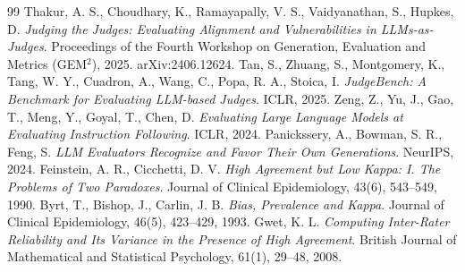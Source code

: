 \documentclass{IOS-Book-Article}
\begin{document}
\begin{thebibliography}{99}
 Thakur, A. S., Choudhary, K., Ramayapally, V. S., Vaidyanathan, S., Hupkes, D. \emph{Judging the Judges: Evaluating Alignment and Vulnerabilities in LLMs-as-Judges}. Proceedings of the Fourth Workshop on Generation, Evaluation and Metrics (GEM$^{2}$), 2025. arXiv:2406.12624.
 Tan, S., Zhuang, S., Montgomery, K., Tang, W. Y., Cuadron, A., Wang, C., Popa, R. A., Stoica, I. \emph{JudgeBench: A Benchmark for Evaluating LLM-based Judges}. ICLR, 2025.
 Zeng, Z., Yu, J., Gao, T., Meng, Y., Goyal, T., Chen, D. \emph{Evaluating Large Language Models at Evaluating Instruction Following}. ICLR, 2024.
 Panickssery, A., Bowman, S. R., Feng, S. \emph{LLM Evaluators Recognize and Favor Their Own Generations}. NeurIPS, 2024.
 Feinstein, A. R., Cicchetti, D. V. \emph{High Agreement but Low Kappa: I. The Problems of Two Paradoxes}. Journal of Clinical Epidemiology, 43(6), 543--549, 1990.
 Byrt, T., Bishop, J., Carlin, J. B. \emph{Bias, Prevalence and Kappa}. Journal of Clinical Epidemiology, 46(5), 423--429, 1993.
 Gwet, K. L. \emph{Computing Inter-Rater Reliability and Its Variance in the Presence of High Agreement}. British Journal of Mathematical and Statistical Psychology, 61(1), 29--48, 2008.
\end{thebibliography}
\end{document}
